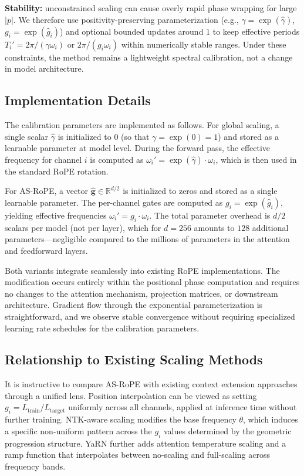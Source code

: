 \documentclass[conference]{IEEEtran}
\begin{document}
\textbf{Stability:} unconstrained scaling can cause overly rapid phase wrapping for large $|p|$. We therefore use positivity-preserving parameterization (e.g., $\gamma=\exp(\hat\gamma)$, $g_i=\exp(\hat g_i)$) and optional bounded updates around $1$ to keep effective periods $T_i'=2\pi/(\gamma\omega_i)$ or $2\pi/(g_i\omega_i)$ within numerically stable ranges. Under these constraints, the method remains a lightweight spectral calibration, not a change in model architecture.

\subsection{Implementation Details}
The calibration parameters are implemented as follows. For global scaling, a single scalar $\hat\gamma$ is initialized to $0$ (so that $\gamma = \exp(0) = 1$) and stored as a learnable parameter at model level. During the forward pass, the effective frequency for channel $i$ is computed as $\omega_i' = \exp(\hat\gamma) \cdot \omega_i$, which is then used in the standard RoPE rotation.

For AS-RoPE, a vector $\hat{\mathbf{g}} \in \mathbb{R}^{d/2}$ is initialized to zeros and stored as a single learnable parameter. The per-channel gates are computed as $g_i = \exp(\hat{g}_i)$, yielding effective frequencies $\omega_i' = g_i \cdot \omega_i$. The total parameter overhead is $d/2$ scalars per model (not per layer), which for $d=256$ amounts to $128$ additional parameters---negligible compared to the millions of parameters in the attention and feedforward layers.

Both variants integrate seamlessly into existing RoPE implementations. The modification occurs entirely within the positional phase computation and requires no changes to the attention mechanism, projection matrices, or downstream architecture. Gradient flow through the exponential parameterization is straightforward, and we observe stable convergence without requiring specialized learning rate schedules for the calibration parameters.

\subsection{Relationship to Existing Scaling Methods}
It is instructive to compare AS-RoPE with existing context extension approaches through a unified lens. Position interpolation \cite{chen2023extending} can be viewed as setting $g_i = L_{\text{train}} / L_{\text{target}}$ uniformly across all channels, applied at inference time without further training. NTK-aware scaling modifies the base frequency $\theta$, which induces a specific non-uniform pattern across the $g_i$ values determined by the geometric progression structure. YaRN \cite{peng2024yarn} further adds attention temperature scaling and a ramp function that interpolates between no-scaling and full-scaling across frequency bands.
\end{document}
